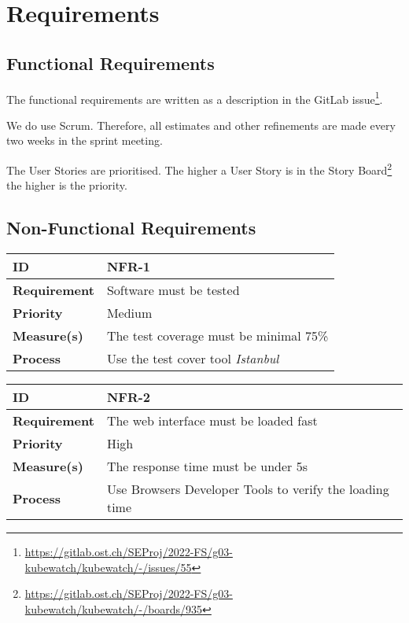 \chapter{Requirements}



\section{Functional Requirements}
The functional requirements are written as a description in the GitLab issue\footnote{\url{https://gitlab.ost.ch/SEProj/2022-FS/g03-kubewatch/kubewatch/-/issues/55}}.

We do use Scrum.
Therefore, all estimates and other refinements are made every two weeks in the sprint meeting.

The User Stories are prioritised.
The higher a User Story is in the Story Board\footnote{\url{https://gitlab.ost.ch/SEProj/2022-FS/g03-kubewatch/kubewatch/-/boards/935}} the higher is the priority.



\section{Non-Functional Requirements}
\begin{center}
\begin{tabular}{ | m{8em} | m{25em}| } 
 \hline
 \textbf{ID} & NFR-1\\ 
 \hline
 \textbf{Requirement} & Software must be tested\\  
 \hline
 \textbf{Priority} & Medium\\
 \hline
 \textbf{Measure(s)} & The test coverage must be minimal 75\%\\
 \hline
 \textbf{Process} & Use the test cover tool \textsl{Istanbul}\\
 \hline
\end{tabular}
\end{center}

\begin{center}
\begin{tabular}{ | m{8em} | m{25em}| } 
 \hline
 \textbf{ID} & NFR-2\\ 
 \hline
 \textbf{Requirement} & The web interface must be loaded fast\\
 \hline
 \textbf{Priority} & High\\
 \hline
 \textbf{Measure(s)} & The response time must be under 5s\\
 \hline
 \textbf{Process} & Use Browsers Developer Tools to verify the loading time\\
 \hline
\end{tabular}
\end{center}

